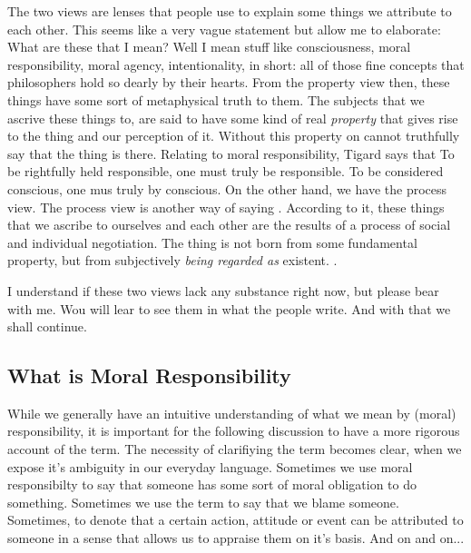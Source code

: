 \documentclass{article}
\begin{document}
The two views are lenses that people use to explain some things we attribute to
each other. This seems like a very vague statement but allow me to elaborate:
What are these  that I mean? Well I mean stuff like consciousness,
moral responsibility, moral agency, intentionality, in short: all of those fine
concepts that philosophers hold so dearly by their hearts. From the property
view then, these things have some sort of metaphysical truth to them. The
subjects that we ascrive these things to, are said to have some kind of real
\textit{property} that gives rise to the thing and our perception of it. Without
this property on cannot truthfully say that the thing is there. Relating to
moral responsibility, Tigard says that 
To be rightfully held responsible, one must truly be responsible. To be
considered conscious, one mus truly by conscious. On the other hand, we have the
process view. The process view is another way of saying . According to it, these things that we ascribe to ourselves and each
other are the results of a process of social and individual negotiation. The
thing is not born from some fundamental property, but from subjectively
\textit{being regarded as} existent. .

I understand if these two views lack any substance right now, but please bear
with me. Wou will lear to see them in what the people write. And with that we
shall continue.

\subsection{What is Moral Responsibility}

 While we generally have an intuitive understanding of what we mean
by (moral) responsibility, it is important for the following discussion to have
a more rigorous account of the term. The necessity of clarifiying the term
becomes clear, when we expose it's ambiguity in our everyday language.
Sometimes we use moral responsibilty to say that someone has some sort of moral
obligation to do something. Sometimes we use the term to say that we blame
someone. Sometimes, to denote that a certain action, attitude or event can be
attributed to someone in a sense that allows us to appraise them on it's basis.
And on and on...
\end{document}
